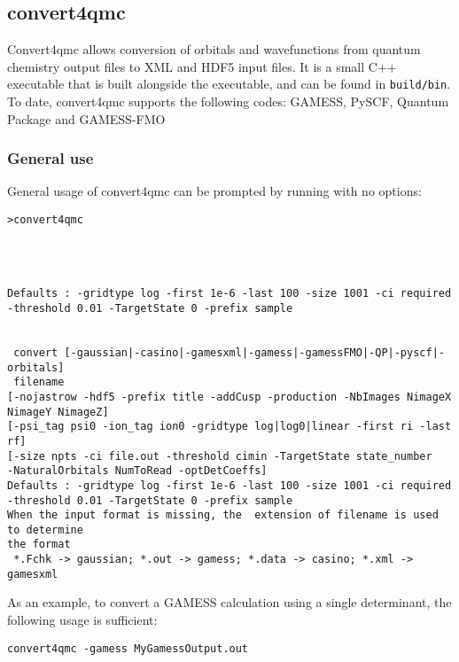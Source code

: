 \subsection{convert4qmc}
\label{sec:convert4qmc}
Convert4qmc allows conversion of orbitals and wavefunctions from
quantum chemistry output files to \qmcpack XML and HDF5 input files.
It is a small C++ executable that is built alongside the \qmcpack
executable, and can be found in \texttt{build/bin}.\\

To date, convert4qmc supports the following codes:
GAMESS\cite{schmidt93}, PySCF\cite{Sun2018}, Quantum Package\cite{QP}
and GAMESS-FMO\cite{Fedorov2004,schmidt93}


\subsubsection{General use}
General usage of convert4qmc can be prompted by running with no options:

\begin{lstlisting}[style=SHELL]
>convert4qmc




Defaults : -gridtype log -first 1e-6 -last 100 -size 1001 -ci required -threshold 0.01 -TargetState 0 -prefix sample


 convert [-gaussian|-casino|-gamesxml|-gamess|-gamessFMO|-QP|-pyscf|-orbitals] 
 filename                                                          
[-nojastrow -hdf5 -prefix title -addCusp -production -NbImages NimageX NimageY NimageZ]
[-psi_tag psi0 -ion_tag ion0 -gridtype log|log0|linear -first ri -last rf]
[-size npts -ci file.out -threshold cimin -TargetState state_number
-NaturalOrbitals NumToRead -optDetCoeffs]                                        
Defaults : -gridtype log -first 1e-6 -last 100 -size 1001 -ci required 
-threshold 0.01 -TargetState 0 -prefix sample                                
When the input format is missing, the  extension of filename is used to determine
the format                                                      
 *.Fchk -> gaussian; *.out -> gamess; *.data -> casino; *.xml -> gamesxml
\end{lstlisting}


As an example, to convert a GAMESS calculation using a single determinant, the following usage is sufficient:\\
\begin{lstlisting}[style=SHELL]
convert4qmc -gamess MyGamessOutput.out
\end{lstlisting}

